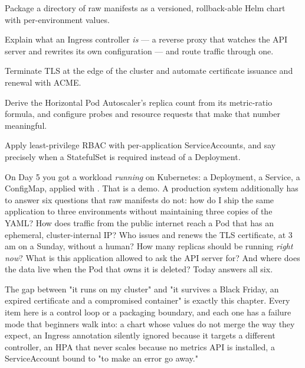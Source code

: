 
\begin{objectives}
\begin{wbitem}
  \item Package a directory of raw manifests as a versioned, rollback-able Helm chart with per-environment values.
  \item Explain what an Ingress controller \emph{is} --- a reverse proxy that watches the API server and rewrites its own configuration --- and route traffic through one.
  \item Terminate TLS at the edge of the cluster and automate certificate issuance and renewal with ACME.
  \item Derive the Horizontal Pod Autoscaler's replica count from its metric-ratio formula, and configure probes and resource requests that make that number meaningful.
  \item Apply least-privilege RBAC with per-application ServiceAccounts, and say precisely when a StatefulSet is required instead of a Deployment.
\end{wbitem}
\end{objectives}


 On Day 5 you got a workload \emph{running} on Kubernetes: a Deployment, a Service, a ConfigMap, applied with . That is a demo. A production system additionally has to answer six questions that raw manifests do not: how do I ship the same application to three environments without maintaining three copies of the YAML? How does traffic from the public internet reach a Pod that has an ephemeral, cluster-internal IP? Who issues and renews the TLS certificate, at 3\,am on a Sunday, without a human? How many replicas should be running \emph{right now}? What is this application allowed to ask the API server for? And where does the data live when the Pod that owns it is deleted? Today answers all six.

 The gap between "it runs on my cluster" and "it survives a Black Friday, an expired certificate and a compromised container" is exactly this chapter. Every item here is a control loop or a packaging boundary, and each one has a failure mode that beginners walk into: a chart whose values do not merge the way they expect, an Ingress annotation silently ignored because it targets a different controller, an HPA that never scales because no metrics API is installed, a ServiceAccount bound to  "to make an error go away."

